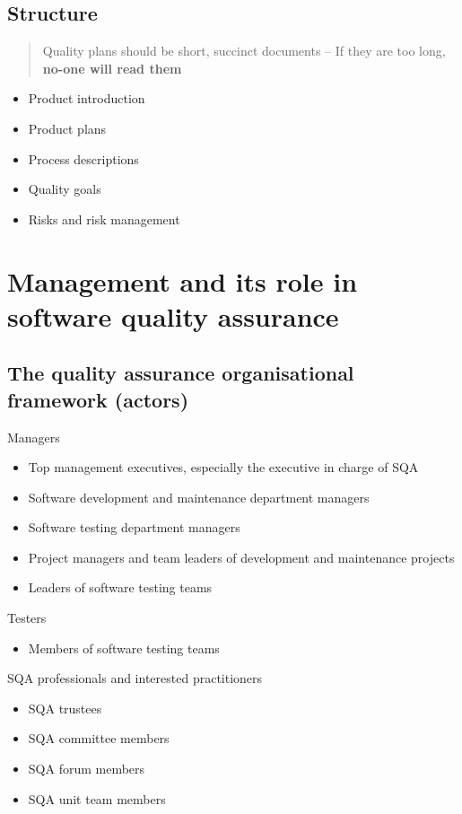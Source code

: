 \documentclass{article}
\begin{document}
\subsection{Structure}
\begin{quote}
Quality plans should be short, succinct documents – If they are too long, \textbf{no-one will read them}
\end{quote}

\begin{itemize}
  \item Product introduction
  \item Product plans
  \item Process descriptions
  \item Quality goals
  \item Risks and risk management
\end{itemize}

\section{Management and its role in software quality assurance}

\subsection{The quality assurance organisational framework (actors)}

\begin{flushleft}
Managers
\begin{itemize}
  \item Top management executives, especially the executive in charge of SQA
  \item Software development and maintenance department managers
  \item Software testing department managers
  \item Project managers and team leaders of development and maintenance projects
  \item Leaders of software testing teams
\end{itemize}
Testers
\begin{itemize}  
  \item Members of software testing teams
\end{itemize}
SQA professionals and interested practitioners
\begin{itemize}
  \item SQA trustees
  \item SQA committee members
  \item SQA forum members
  \item SQA unit team members
\end{itemize}
\end{flushleft}
\end{document}
